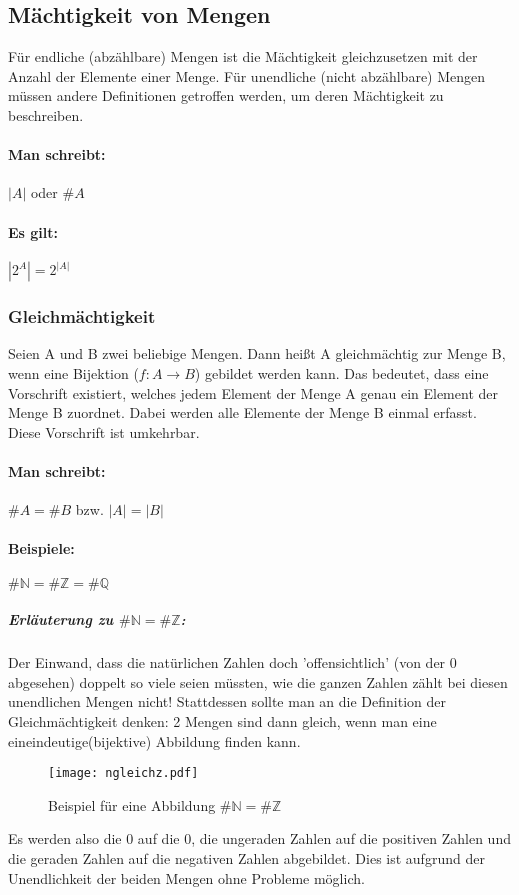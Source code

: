 \subsection{Mächtigkeit von Mengen}
Für endliche (abzählbare) Mengen ist die Mächtigkeit gleichzusetzen mit der Anzahl
der Elemente einer Menge. Für unendliche (nicht abzählbare) Mengen müssen andere
Definitionen getroffen werden, um deren Mächtigkeit zu beschreiben.
\paragraph{Man schreibt:}
\({}|{}A{}|{}\) oder \(\#A\)
\paragraph{Es gilt:}
\begin{math}
{}|{}2^A{}|{} = 2^{{}|{}A{}|{}}
\end{math}
\subsubsection*{Gleichmächtigkeit}
Seien A und B zwei beliebige Mengen.
Dann heißt A gleichmächtig zur Menge B, wenn eine Bijektion (\({f:A}\rightarrow{B}\)) gebildet
werden kann. Das bedeutet, dass eine Vorschrift existiert, welches
jedem Element der Menge A genau ein Element der Menge B zuordnet.
Dabei werden alle Elemente der Menge B einmal erfasst. Diese
Vorschrift ist umkehrbar.
\paragraph{Man schreibt:} \(\#A = \#B\) bzw. \(|A| = |B|\)
\paragraph*{Beispiele:}
\begin{math}
\#{\mathbb N} = \#{\mathbb Z} = \#{\mathbb Q}
\end{math}
\subparagraph{Erläuterung zu \(\#{\mathbb N} = \#{\mathbb Z}\):} Der
Einwand, dass die natürlichen Zahlen doch 'offensichtlich' (von der 0
abgesehen) doppelt so viele seien müssten, wie die ganzen Zahlen zählt
bei diesen unendlichen Mengen nicht! Stattdessen sollte man an die
Definition der Gleichmächtigkeit denken: 2 Mengen sind dann gleich,
wenn man eine eineindeutige(bijektive) Abbildung finden kann.
\begin{figure}[b]
  \centering
  \caption{Beispiel für eine Abbildung \(\#{\mathbb N} = \#{\mathbb Z}\)}
  \texttt{[image: ngleichz.pdf]}
\end{figure}
Es werden also die 0 auf die 0, die ungeraden Zahlen auf die positiven
Zahlen und die geraden Zahlen auf die negativen Zahlen abgebildet.
Dies ist aufgrund der Unendlichkeit der beiden Mengen ohne Probleme
möglich.

